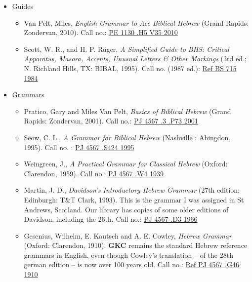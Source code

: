 \documentclass[titlepage]{article}
\begin{document}
\begin{itemize}
  \item Guides

    \begin{itemize}
      \item
        Van Pelt, Miles, \emph{English Grammar to Ace Biblical Hebrew}
        (Grand Rapids: Zondervan, 2010). Call no.:
        \href{http://cat.tyndale.ca/vwebv/holdingsInfo?bibId=146389}{PE 1130 .H5 V35 2010}
      \item
        Scott, W. R., and H. P. Rüger, \emph{A Simplified Guide to BHS:
        Critical Apparatus, Masora, Accents, Unusual Letters \& Other
        Markings} (3rd ed.; N. Richland Hills, TX: BIBAL, 1995). Call
        no. (1987 ed.):
        \href{http://cat.tyndale.ca/vwebv/holdingsInfo?bibId=73217}{Ref BS 715 1984}
    \end{itemize}

  \item Grammars

    \begin{itemize}
      \item
        Pratico, Gary and Miles Van Pelt, \emph{Basics of Biblical Hebrew}
        (Grand Rapids: Zondervan, 2001). Call no.:
        \href{http://cat.tyndale.ca/vwebv/holdingsInfo?bibId=58735}{PJ 4567 .3 .P73 2001}
      \item
        Seow, C. L., \emph{A Grammar for Biblical Hebrew} (Nashville   :
        Abingdon, 1995). Call no.                                      :
        \href{http://cat.tyndale.ca/vwebv/holdingsInfo?bibId=23111}{PJ 4567 .S424 1995}
      \item
        Weingreen, J., \emph{A Practical Grammar for Classical Hebrew}
        (Oxford: Clarendon, 1959). Call no.:
        \href{http://cat.tyndale.ca/vwebv/holdingsInfo?bibId=13817}{PJ 4567 .W4 1939}
      \item
        Martin, J. D., \emph{Davidson’s Introductory Hebrew Grammar}
        (27th edition; Edinburgh: T\&T Clark, 1993). This is the grammar
        I was assigned in St Andrews, Scotland. Our library has copies
        of some older editions of Davidson, including the 26th. Call no.:
        \href{http://cat.tyndale.ca/vwebv/holdingsInfo?bibId=13804}{PJ 4567 .D3 1966}
      \item
        Gesenius, Wilhelm, E. Kautsch and A. E. Cowley, \emph{Hebrew
        Grammar} (Oxford: Clarendon, 1910). \textbf{GKC} remains the
        standard Hebrew reference grammars in English, even though
        Cowley's translation -- of the 28th german edition -- is now
        over 100 years old. Call no.:
        \href{http://cat.tyndale.ca/vwebv/holdingsInfo?bibId=72811}{Ref PJ 4567 .G46 1910}
    \end{itemize}


\end{itemize}
\end{document}
